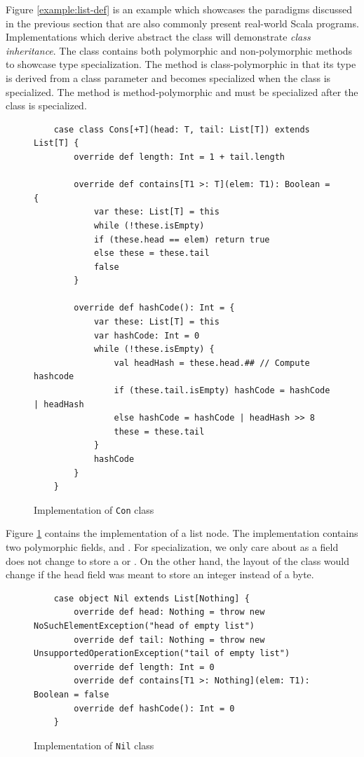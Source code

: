 Figure \ref{example:list-def} is an example which showcases the paradigms discussed in the previous section that are also commonly present real-world Scala programs.
Implementations which derive abstract the  class will demonstrate \textit{class inheritance}.
The  class contains both polymorphic and non-polymorphic methods to showcase type specialization.
The  method is class-polymorphic in that its type is derived from a class parameter and becomes specialized when the class is specialized.
The  method is method-polymorphic and must be specialized after the class is specialized.

\begin{figure}[!htb]
	\begin{verbatim}
	case class Cons[+T](head: T, tail: List[T]) extends List[T] {
		override def length: Int = 1 + tail.length
		
		override def contains[T1 >: T](elem: T1): Boolean = {
			var these: List[T] = this
			while (!these.isEmpty) 
			if (these.head == elem) return true
			else these = these.tail
			false
		}
			
		override def hashCode(): Int = {
			var these: List[T] = this
			var hashCode: Int = 0
			while (!these.isEmpty) {
				val headHash = these.head.## // Compute hashcode
				if (these.tail.isEmpty) hashCode = hashCode | headHash
				else hashCode = hashCode | headHash >> 8
				these = these.tail
			}
			hashCode
		}
	}
	\end{verbatim}
	\caption{Implementation of \texttt{Con} class}
	\label{example:cons-impl}
\end{figure}

Figure \ref{example:cons-impl} contains the implementation of a list node.
The  implementation contains two polymorphic fields,  and .
For specialization, we only care about  as a field does not change to store a  or .
On the other hand, the layout of the class would change if the head field was meant to store an integer instead of a byte.

\begin{figure}[!htb]
	\begin{verbatim}
	case object Nil extends List[Nothing] {
		override def head: Nothing = throw new NoSuchElementException("head of empty list")
		override def tail: Nothing = throw new UnsupportedOperationException("tail of empty list")
		override def length: Int = 0
		override def contains[T1 >: Nothing](elem: T1): Boolean = false
		override def hashCode(): Int = 0
	}
	\end{verbatim}
	\caption{Implementation of \texttt{Nil} class}
	\label{example:nil-impl}
\end{figure}

